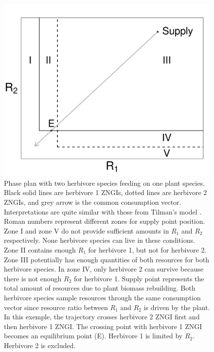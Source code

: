 \documentclass[12pt]{article}
\begin{document}
\begin{figure}[h]
\centering
\includegraphics[width=15 cm,keepaspectratio]{TwoHerbivoresOnePlant}%
\caption{Phase plan with two herbivore species feeding on one plant species. Black solid lines are herbivore 1 ZNGIs, dotted lines are herbivore 2 ZNGIs, and grey arrow is the common consumption vector. Interpretations are quite similar with those from Tilman's model \citep{Tilman1982}. Roman numbers represent different zones for supply point position. Zone I and zone V do not provide sufficient amounts in $R_1$ and $R_2$ respectively. None herbivore species can live in these conditions. Zone II contains enough $R_1$ for herbivore 1, but not for herbivore 2. Zone III potentially has enough quantities of both resources for both herbivore species. In zone IV, only herbivore 2 can survive because there is not enough $R_2$ for herbivore 1. Supply point represents the total amount of resources due to plant biomass rebuilding. Both herbivore species sample resources through the same consumption vector since resource ratio between $R_1$ and $R_2$ is driven by the plant. In this exemple, the trajectory crosses herbivore 2 ZNGI first and then herbivore 1 ZNGI. The crossing point with herbivore 1 ZNGI becomes an equilibrium point (E). Herbivore 1 is limited by $R_2$. Herbivore 2 is excluded.}
\label{herbifig}
\end{figure}
\end{document}
